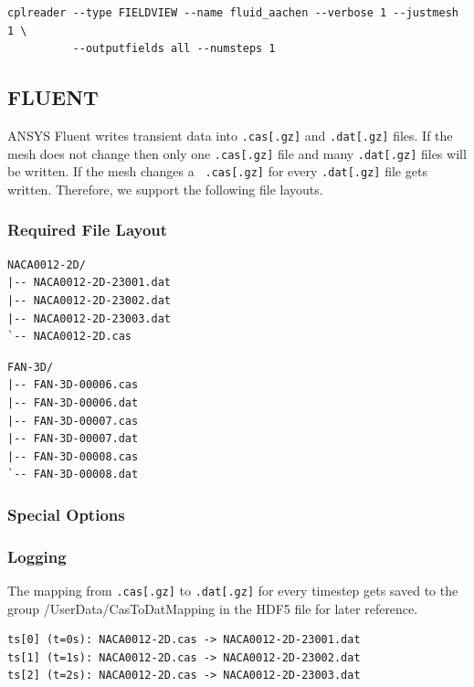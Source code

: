 \documentclass[a4paper,10pt]{article}
\begin{document}
\begin{verbatim}
cplreader --type FIELDVIEW --name fluid_aachen --verbose 1 --justmesh 1 \
          --outputfields all --numsteps 1
\end{verbatim}

\newpage
\subsection{FLUENT}
\label{sec:fluent}

ANSYS Fluent  writes transient data  into {\tt .cas[.gz]} and  {\tt .dat[.gz]}
files.  If  the mesh does  not change then  only one {\tt .cas[.gz]}  file and
many  {\tt .dat[.gz]}  files will  be  written.  If  the mesh  changes a  {\tt
.cas[.gz]} for every {\tt .dat[.gz]} file gets written.  Therefore, we support
the following file layouts.


\subsubsection{Required File Layout}

\begin{verbatim}
NACA0012-2D/
|-- NACA0012-2D-23001.dat
|-- NACA0012-2D-23002.dat
|-- NACA0012-2D-23003.dat
`-- NACA0012-2D.cas
\end{verbatim}

\begin{verbatim}
FAN-3D/
|-- FAN-3D-00006.cas
|-- FAN-3D-00006.dat
|-- FAN-3D-00007.cas
|-- FAN-3D-00007.dat
|-- FAN-3D-00008.cas
`-- FAN-3D-00008.dat
\end{verbatim}

\subsubsection{Special Options}

\subsubsection{Logging} 

The mapping  from {\tt .cas[.gz]} to  {\tt .dat[.gz]} for  every timestep gets
saved  to the  group  /UserData/CasToDatMapping  in the  HDF5  file for  later
reference.

\begin{verbatim}
ts[0] (t=0s): NACA0012-2D.cas -> NACA0012-2D-23001.dat
ts[1] (t=1s): NACA0012-2D.cas -> NACA0012-2D-23002.dat
ts[2] (t=2s): NACA0012-2D.cas -> NACA0012-2D-23003.dat
\end{verbatim}
\end{document}
